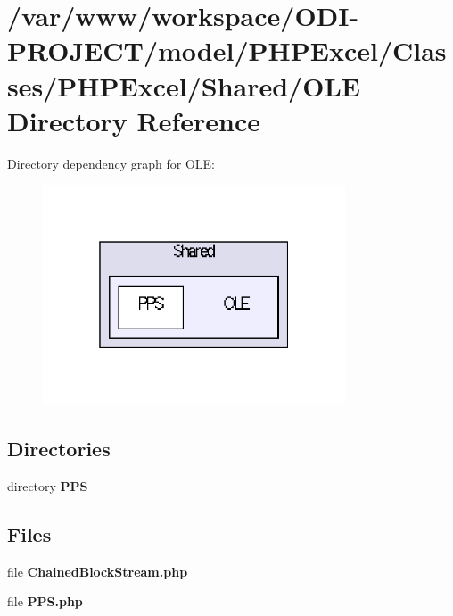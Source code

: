 \section{/var/www/workspace/\+O\+D\+I-\/\+P\+R\+O\+J\+E\+C\+T/model/\+P\+H\+P\+Excel/\+Classes/\+P\+H\+P\+Excel/\+Shared/\+O\+L\+E Directory Reference}
\label{dir_3b311aa8d47c90d46692b23022c472aa}
Directory dependency graph for O\+L\+E\+:\nopagebreak
\begin{figure}[H]
\begin{center}
\leavevmode
\includegraphics[width=254pt]{dir_3b311aa8d47c90d46692b23022c472aa_dep}
\end{center}
\end{figure}
\subsection*{Directories}
\begin{DoxyCompactItemize}
\item 
directory {\bf P\+P\+S}
\end{DoxyCompactItemize}
\subsection*{Files}
\begin{DoxyCompactItemize}
\item 
file {\bfseries Chained\+Block\+Stream.\+php}
\item 
file {\bfseries P\+P\+S.\+php}
\end{DoxyCompactItemize}
